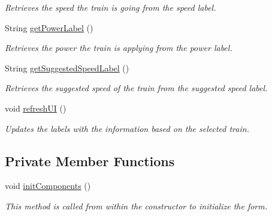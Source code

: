 \begin{DoxyCompactItemize}
\begin{DoxyCompactList}\small\item\em Retrieves the speed the train is going from the speed label. \end{DoxyCompactList}\item 
String \hyperlink{classTrainControllerComps_1_1TCTrainInfoPane_a5c3ebdfe9c6a2d7357a460475e9fd55c}{get\+Power\+Label} ()
\begin{DoxyCompactList}\small\item\em Retrieves the power the train is applying from the power label. \end{DoxyCompactList}\item 
String \hyperlink{classTrainControllerComps_1_1TCTrainInfoPane_ae8aae7010c588984b4bdc7f1422e1d3e}{get\+Suggested\+Speed\+Label} ()
\begin{DoxyCompactList}\small\item\em Retrieves the suggested speed of the train from the suggested speed label. \end{DoxyCompactList}\item 
void \hyperlink{classTrainControllerComps_1_1TCTrainInfoPane_a82dcf410364f2712296b1505d6175b3a}{refresh\+UI} ()
\begin{DoxyCompactList}\small\item\em Updates the labels with the information based on the selected train. \end{DoxyCompactList}\end{DoxyCompactItemize}
\subsection*{Private Member Functions}
\begin{DoxyCompactItemize}
\item 
void \hyperlink{classTrainControllerComps_1_1TCTrainInfoPane_a875ccb16a90d10cc999f0c274824778e}{init\+Components} ()
\begin{DoxyCompactList}\small\item\em This method is called from within the constructor to initialize the form. \end{DoxyCompactList}\end{DoxyCompactItemize}
